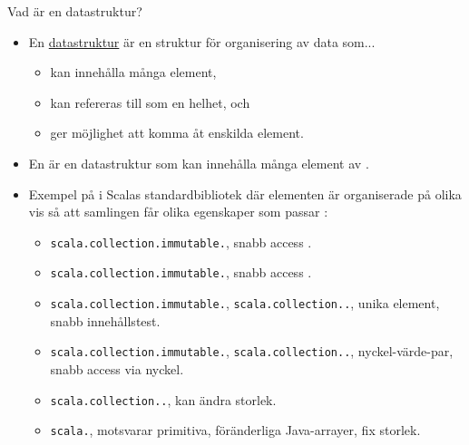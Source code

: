 

\begin{Slide}{Vad är en datastruktur?}\SlideFontSmall
\setlength{\leftmargini}{0pt}
\begin{itemize}
\item En \href{https://sv.wikipedia.org/wiki/Datastruktur}{datastruktur} är en struktur för organisering av data som...
\begin{itemize}\SlideFontTiny
\item kan innehålla många element,
\item kan refereras till som en helhet, och
\item ger möjlighet att komma åt enskilda element.
\end{itemize}

\item En   är en datastruktur som kan innehålla många element av .

\item Exempel på  i Scalas standardbibliotek där elementen är organiserade på olika vis så att samlingen får olika egenskaper som passar : 
\begin{itemize}\SlideFontTiny
\item \texttt{scala.collection.immutable.}, snabb access .
\item \texttt{scala.collection.immutable.}, snabb access .
\item \texttt{scala.collection.immutable.}, \texttt{scala.collection..}, unika element, snabb innehållstest.
\item \texttt{scala.collection.immutable.}, \texttt{scala.collection..}, nyckel-värde-par, snabb access via nyckel.
\item \texttt{scala.collection..}, kan ändra storlek.
\item \texttt{scala.}, motsvarar primitiva, föränderliga Java-arrayer, fix storlek.
\end{itemize}

\end{itemize}

\end{Slide} 



